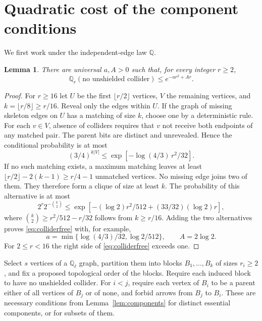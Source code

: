 \documentclass[11pt]{article}
\newtheorem{lemma}[theorem]{Lemma}
\theoremstyle{remark}
\newcommand{\Q}{\mathbb Q}
\begin{document}
\section{Quadratic cost of the component conditions}
We first work under the independent-edge law $\Q$.
\begin{lemma}\label{lem:colliderfree}
There are universal $a,A>0$ such that, for every integer $r\ge2$,
\begin{equation}\label{eq:colliderfree}
 \Q_r(\text{no unshielded collider})\le e^{-ar^2+Ar}.
\end{equation}
\end{lemma}
\begin{proof}
For $r\ge16$ let $U$ be the first $\lfloor r/2\rfloor$ vertices, $V$ the
remaining vertices, and $k=\lfloor r/8\rfloor\ge r/16$. Reveal only the
edges within $U$. If the graph of missing skeleton edges on $U$ has a
matching of size $k$, choose one by a deterministic rule. For each $v\in V$,
absence of colliders requires that $v$ not receive both endpoints of any
matched pair. The parent bits are distinct and unrevealed. Hence the
conditional probability is at most
\[
 (3/4)^{k|V|}\le\exp[-\log(4/3)\,r^2/32].
\]
If no such matching exists, a maximum matching leaves at least
$\lfloor r/2\rfloor-2(k-1)\ge r/4-1$ unmatched vertices. No missing
edge joins two of them. They therefore form a clique of size at least $k$.
The probability of this alternative is at most
\[
 2^r2^{-\binom k2}
 \le\exp[-(\log2)r^2/512+(33/32)(\log2)r],
\]
where $\binom k2\ge r^2/512-r/32$ follows from $k\ge r/16$.
Adding the two alternatives proves \eqref{eq:colliderfree} with, for example,
\[
 a=\min\{\log(4/3)/32,\log2/512\},\qquad A=2\log2.
\]
For $2\le r<16$ the right side of \eqref{eq:colliderfree} exceeds one.
\end{proof}

Select $s$ vertices of a $\Q_\ell$ graph, partition them into blocks
$B_1,\ldots,B_k$ of sizes $r_i\ge2$, and fix a proposed topological order
of the blocks. Require each induced block to have no unshielded collider.
For $i<j$, require each vertex of $B_i$ to be a parent either of all
vertices of $B_j$ or of none, and forbid arrows from $B_j$ to $B_i$.
These are necessary conditions from Lemma~\ref{lem:components} for distinct
essential components, or for subsets of them.
\end{document}
